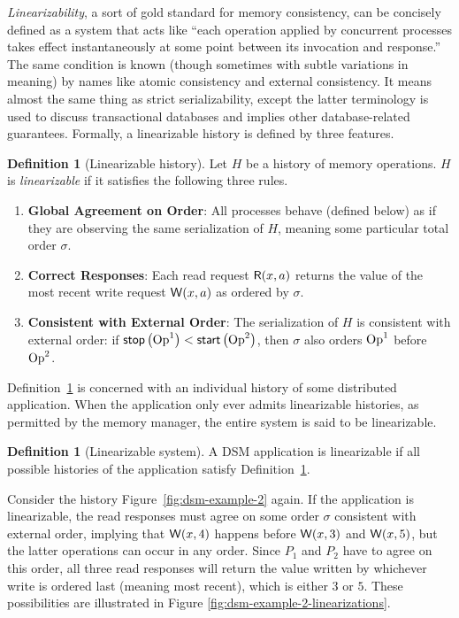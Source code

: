 \documentclass[]             %
{NASA}                       %
\theoremstyle{definition}
\newtheorem{definition}[theorem]{Definition}
\providecommand{\tightlist}{%
  \setlength{\itemsep}{0pt}\setlength{\parskip}{0pt}}
\begin{document}
\emph{Linearizability}, a sort of gold standard for memory
consistency, can be concisely defined as a system that acts like
``each operation applied by concurrent processes takes effect
instantaneously at some point between its invocation and response.''
\cite{10.1145/78969.78972} The same condition is known (though
sometimes with subtle variations in meaning) by names like atomic
consistency and external consistency. It means almost the same thing
as strict serializability, except the latter terminology is used to
discuss transactional databases and implies other database-related
guarantees. Formally, a linearizable history is defined by three
features.
\begin{definition}[Linearizable history]
  \label{def:linearizable-history}
  Let $H$ be a history of memory operations. $H$ is
  \emph{linearizable} if it satisfies the following three rules.
\begin{enumerate}
  \tightlist
\item \textbf{Global Agreement on Order}: All processes behave
  (defined below) as if they are observing the same serialization of
  $H$, meaning some particular total order $\sigma$.
\item \textbf{Correct Responses}: Each read request
  \(\mathsf{R}\!\left(x, a\right)\) returns the value of the most recent write
  request \(\mathsf{W}\!\left(x, a\right)\) as ordered by $\sigma$.
\item \textbf{Consistent with External Order}: The serialization of
  $H$ is consistent with external order: if
  $\mathsf{stop}\left(\mathrm{Op}^1\right) < \mathsf{start}\left(\mathrm{Op}^2\right)$, then $\sigma$ also orders
  $\mathrm{Op}^1$ before $\mathrm{Op}^2$.
\end{enumerate}
\end{definition}

Definition~\ref{def:linearizable-history} is concerned with an
individual history of some distributed application. When the
application only ever admits linearizable histories, as permitted by
the memory manager, the entire system is said to be linearizable.

\begin{definition}[Linearizable system]
  \label{def:linearizable-system}
  A DSM application is linearizable if all possible histories of the
  application satisfy Definition~\ref{def:linearizable-history}.
\end{definition}

Consider the history Figure~\ref{fig:dsm-example-2} again. If the
application is linearizable, the read responses must agree on some
order $\sigma$ consistent with external order, implying that
$\mathsf{W}\!\left(x, 4\right)$ happens before $\mathsf{W}\!\left(x, 3\right)$ and
$\mathsf{W}\!\left(x, 5\right)$, but the latter operations can occur in any
order. Since $P_1$ and $P_2$ have to agree on this order, all three
read responses will return the value written by whichever write is
ordered last (meaning most recent), which is either $3$ or $5$. These
possibilities are illustrated in Figure
\ref{fig:dsm-example-2-linearizations}.
\end{document}
